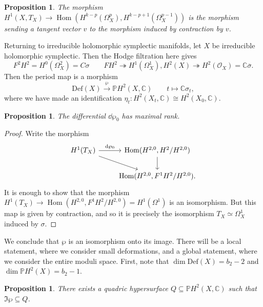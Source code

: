 \documentclass[leqno, openany]{memoir}
\newtheorem{prop}[thm]{Proposition}
\theoremstyle{definition}
\theoremstyle{remark}
\theoremstyle{plain}
\theoremstyle{definition}
\theoremstyle{remark}
\newcommand{\C}{\mathbb{C}}
\renewcommand{\P}{\mathbb{P}}
\newcommand{\mc}[1]{\mathcal{#1}}
\newcommand{\mr}[1]{\mathrm{#1}}
\newcommand{\ol}[1]{\overline{#1}}
\DeclareMathOperator{\Hom}{Hom}
\begin{document}
\begin{prop}
    The morphism $H^1(X, T_X) \to \Hom(H^{k-p}(\Omega^p_X), H^{k-p+1}(\Omega_X^{p-1}))$ is the morphism sending a tangent vector $v$ to the morphism induced by contraction by $v$.
\end{prop}

Returning to irreducible holomorphic symplectic manifolds, let $X$ be irreducible holomorphic symplectic. Then the Hodge filtration here gives
\[ F^2 H^2 = H^0(\Omega^2_X) = C \sigma \qquad F H^2 \twoheadrightarrow H^1(\Omega^1_X), H^2(X) \twoheadrightarrow H^2(\mc{O}_X) = \C \ol{\sigma}. \]
Then the period map is a morphism
\[ \mr{Def}(X) \xrightarrow{\wp} \P H^2(X, \C) \qquad t \mapsto \C \sigma_t, \]
where we have made an identification $\eta_t \colon H^2(X_t, \C) \cong H^2(X_0, \C)$.

\begin{prop}
    The differential $\dd{\wp_0}$ has maximal rank.
\end{prop}

\begin{proof}
    Write the morphism
    \begin{equation*}
    \begin{tikzcd}
        H^1(T_X) \ar{r}{\dd{\wp_0}} \ar{dr} & \Hom(H^{2,0}, H^2/H^{2,0}) \ar{d} \\
        & \Hom(H^{2,0}, F^1 H^2 / H^{2,0}).
    \end{tikzcd}
    \end{equation*}
    It is enough to show that the morphism $H^1(T_X) \to \Hom(H^{2,0}, F^1 H^2 / H^{2,0}) = H^1(\Omega^1)$ is an isomorphism. But this map is given by contraction, and so it is precisely the isomorphism $T_X \simeq \Omega^1_X$ induced by $\sigma$.
\end{proof}
We conclude that $\wp$ is an isomorphism onto its image. There will be a local statement, where we consider small deformations, and a global statement, where we consider the entire moduli space. First, note that $\dim \mr{Def}(X) = b_2 - 2$ and $\dim \P H^2(X) = b_2 - 1$.

\begin{prop}
    There exists a quadric hypersurface $Q \subseteq \P H^2(X, \C)$ such that $\Im \wp \subseteq Q$.
\end{prop}
\end{document}
